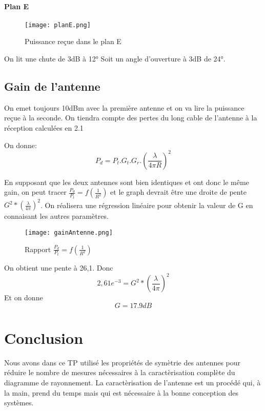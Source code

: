 \documentclass[oneside,a4paper,12pt]{article}
\begin{document}
	\paragraph{Plan E}

	\begin{figure}[h]
		\centering
		\texttt{[image: planE.png]}
		\caption{Puissance reçue dans le plan E}
	\end{figure}

	On lit une chute de 3dB à 12° Soit un angle d'ouverture à 3dB de 24°.

	\subsection{Gain de l'antenne}

	On emet toujours 10dBm avec la première antenne et on va lire la puissance reçue à la seconde.
	On tiendra compte des pertes du long cable de l'antenne à la réception calculées en 2.1

	On donne:
	\[ P_{d} = P_{t}.G_{t}.G_{r}.(\frac{\lambda}{4 \pi R})^{2} \]

	En supposant que les deux antennes sont bien identiques et ont donc le même gain,
	on peut tracer $ \frac{P_{d}}{P_{t}} = f(\frac{1}{R^{2}}) $ et le graph devrait être une droite de pente $ G^{2}*(\frac{\lambda}{4 \pi})^{2} $.
	On réalisera une régression linéaire pour obtenir la valeur de G en connaisant les autres paramètres.

	\begin{figure}[h]
		\centering
		\texttt{[image: gainAntenne.png]}
		\caption{Rapport $ \frac{P_{d}}{P_{t}} = f(\frac{1}{R^{2}}) $ }
	\end{figure}

	On obtient une pente à 26,1.
	Donc \[ 2,61e^{-3} = G^{2}*(\frac{\lambda}{4 \pi})^{2} \]
	Et on donne \[ G=17.9 dB \]

	\newpage
	\section{Conclusion}
	Nous avons dans ce TP utilisé les propriétés de symètrie des antennes pour réduire le nombre de mesures nécessaires à la caractèrisation complète du diagramme de rayonnement.
	La caractèrisation de l'antenne est un procédé qui, à la main, prend du temps mais qui est nécessaire à la bonne conception des systèmes.
		
\end{document}
